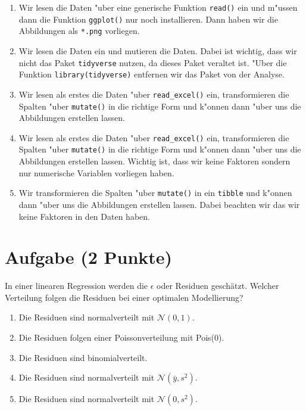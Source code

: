\documentclass[a4paper, 9pt]{scrartcl}\usepackage[]{graphicx}\usepackage[]{xcolor}
\begin{document}
\begin{enumerate}
\item [\textbf{A} \msquare] Wir lesen die Daten {"u}ber eine generische Funktion \texttt{read()} ein und m{"u}ssen dann die Funktion \texttt{ggplot()} nur noch installieren. Dann haben wir die Abbildungen als \texttt{*.png} vorliegen.
\item [\textbf{B} \msquare] Wir lesen die Daten ein und mutieren die Daten. Dabei ist wichtig, dass wir nicht das Paket \texttt{tidyverse} nutzen, da dieses Paket veraltet ist. {"U}ber die Funktion \texttt{library(tidyverse)} entfernen wir das Paket von der Analyse.
\item [\textbf{C} \msquare] Wir lesen als erstes die Daten {"u}ber \texttt{read\_excel()} ein, transformieren die Spalten {"u}ber \texttt{mutate()} in die richtige Form und k{"o}nnen dann {"u}ber  uns die Abbildungen erstellen lassen.
\item [\textbf{D} \msquare] Wir lesen als erstes die Daten {"u}ber \texttt{read\_excel()} ein, transformieren die Spalten {"u}ber \texttt{mutate()} in die richtige Form und k{"o}nnen dann  {"u}ber  uns die Abbildungen erstellen lassen. Wichtig ist, dass wir keine Faktoren sondern nur numerische Variablen vorliegen haben.
\item [\textbf{E} \msquare] Wir transformieren die Spalten {"u}ber \texttt{mutate()} in ein \texttt{tibble} und k{"o}nnen dann {"u}ber  uns die Abbildungen erstellen lassen. Dabei beachten wir das wir keine Faktoren in den Daten haben.
\end{enumerate}

\section{Aufgabe \hfill (2 Punkte)}

In einer linearen Regression werden die $\epsilon$ oder Residuen
gesch{\"a}tzt. Welcher Verteilung folgen die Residuen bei einer optimalen
Modellierung? 



\begin{enumerate}
\item [\textbf{A} \msquare] Die Residuen sind normalverteilt mit $\mathcal{N}(0, 1)$.
\item [\textbf{B} \msquare] Die Residuen folgen einer Poissonverteilung mit Pois(0).
\item [\textbf{C} \msquare] Die Residuen sind binomialverteilt.
\item [\textbf{D} \msquare] Die Residuen sind normalverteilt mit $\mathcal{N}(\bar{y}, s^2)$.
\item [\textbf{E} \msquare] Die Residuen sind normalverteilt mit $\mathcal{N}(0, s^2)$.
\end{enumerate}
\end{document}

